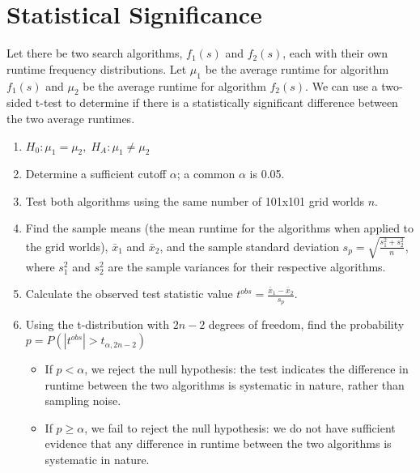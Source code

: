 \documentclass{article}
\begin{document}
\section{Statistical Significance}
Let there be two search algorithms, $f_1(s)$ and $f_2(s)$, each with their own runtime frequency distributions. Let $\mu_1$ be the average runtime for algorithm $f_1(s)$ and $\mu_2$ be the average runtime for algorithm $f_2(s)$. We can use a two-sided t-test to determine if there is a statistically significant difference between the two average runtimes.
\begin{enumerate}
    \item $H_0: \mu_1=\mu_2, \;H_A:\mu_1\ne\mu_2$
    \item Determine a sufficient cutoff $\alpha$; a common $\alpha$ is 0.05.
    \item Test both algorithms using the same number of 101x101 grid worlds $n$.
    \item Find the sample means (the mean runtime for the algorithms when applied to the grid worlds), $\bar x_1$ and $\bar x_2$, and the sample standard deviation $s_p = \sqrt{\frac{s_1^2+s_2^2}{n}}$, where $s_1^2$ and $s_2^2$ are the sample variances for their respective algorithms.
    \item Calculate the observed test statistic value $t^{obs} = \frac{\bar x_1 - \bar x_2}{s_p}$.
    \item Using the t-distribution with $2n-2$ degrees of freedom, find the probability $p = P(|t^{obs}| > t_{\alpha, 2n-2})$
    \begin{itemize}
        \item If $p < \alpha$, we reject the null hypothesis: the test indicates the difference in runtime between the two algorithms is systematic in nature, rather than sampling noise.
        \item If $p \ge \alpha$, we fail to reject the null hypothesis: we do not have sufficient evidence that any difference in runtime between the two algorithms is systematic in nature.
    \end{itemize}
\end{enumerate}
\end{document}
